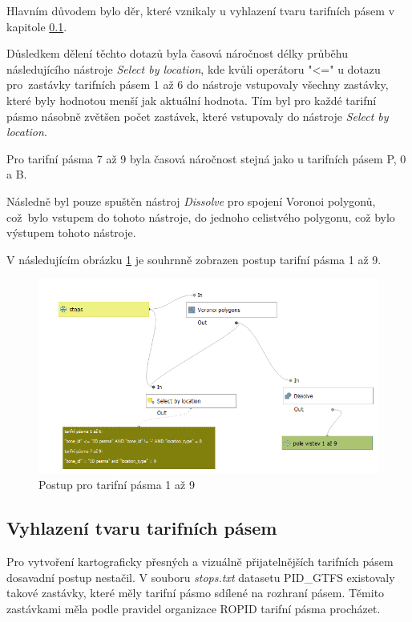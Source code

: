 Hlavním důvodem bylo  děr, které vznikaly u vyhlazení tvaru tarifních pásem v kapitole \ref{vyhlazeni}.  

Důsledkem dělení těchto dotazů byla časová náročnost délky průběhu následujícího nástroje \textit{Select by location}, 
kde kvůli operátoru "<=" u dotazu pro~zastávky tarifních pásem 1 až 6 do nástroje vstupovaly všechny zastávky, 
které byly hodnotou  menší jak aktuální hodnota. Tím byl pro každé tarifní pásmo násobně zvětšen počet zastávek,
které vstupovaly do nástroje \textit{Select by location}.

Pro tarifní pásma 7 až 9 byla časová náročnost stejná jako u tarifních pásem P, 0 a B.

Následně byl pouze spuštěn nástroj \textit{Dissolve} pro spojení Voronoi polygonů, což~bylo vstupem do tohoto nástroje,
do jednoho celistvého polygonu, což bylo výstupem tohoto nástroje.

V následujícím obrázku \ref{fig:postup-voronoi-1az9} je souhrnně zobrazen postup tarifní pásma 1 až 9.

\begin{figure}[H] \centering
    \includegraphics[width=400pt]{./pictures/postup-voronoi-1az9.png}
    \caption[Postup pro tarifní pásma 1 až 9]{Postup pro tarifní pásma 1 až 9}
	\label{fig:postup-voronoi-1az9}              
\end{figure}

\subsection{Vyhlazení tvaru tarifních pásem}
\label{vyhlazeni}

Pro vytvoření kartograficky přesných a vizuálně přijatelnějších tarifních pásem dosa\-vadní postup nestačil.
V souboru \textit{stops.txt} datasetu PID\_GTFS existovaly takové zastávky, které měly tarifní pásmo sdílené
na rozhraní pásem. Těmito zastávkami měla podle pravidel organizace ROPID tarifní pásma procházet.


